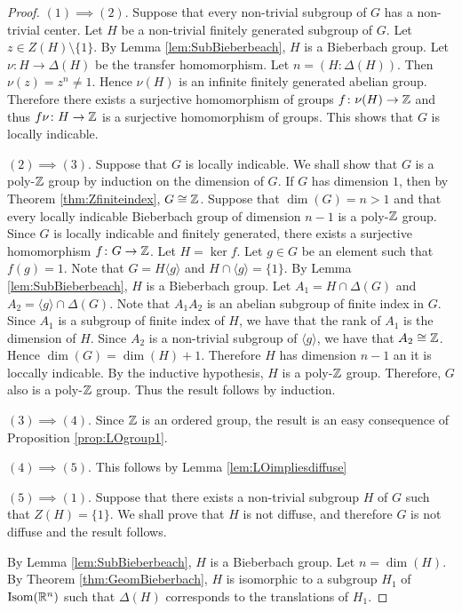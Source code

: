 \begin{proof}
$(1)\implies (2).$ Suppose that every non-trivial subgroup of $G$ has a non-trivial center. Let $H$ be a non-trivial finitely generated subgroup of $G$. Let $z\in Z(H)\setminus \{ 1\}$. By Lemma \ref{lem:SubBieberbeach}, $H$ is a Bieberbach group.  Let $\nu\colon H\to\Delta(H)$ be the transfer homomorphism. Let $n=(H:\Delta(H))$. Then $\nu(z)=z^n\neq 1$. Hence $\nu(H)$ is an infinite finitely generated abelian group. Therefore there exists a surjective homomorphism of groups $f\colon \nu(H)\to\mathbb{Z}$ and thus $f\nu \colon H\to\mathbb{Z}$ is a surjective homomorphism of groups. This shows that $G$ is locally indicable. 

$(2)\implies (3).$ Suppose that $G$ is locally indicable. We shall show that $G$ is a poly-$\mathbb{Z}$ group by induction on the dimension of $G$. If $G$ has dimension $1$, then by Theorem \ref{thm:Zfiniteindex}, $G\cong \mathbb{Z}$. Suppose that $\dim(G)=n>1$ and that every locally indicable Bieberbach group of dimension $n-1$ is a poly-$\mathbb{Z}$ group. Since $G$ is locally indicable and finitely generated, there exists a surjective homomorphism $f\colon G\to\mathbb{Z}$. Let $H=\ker f$. Let $g\in G$ be an element such that $f(g)=1$. Note that $G=H\langle g\rangle$ and $H\cap \langle g\rangle=\{ 1\}$. By Lemma \ref{lem:SubBieberbeach}, $H$ is a Bieberbach group. Let $A_1=H\cap\Delta (G)$ and $A_2=\langle g\rangle \cap\Delta(G)$. Note that $A_1A_2$ is an abelian subgroup of finite index in $G$. Since $A_1$ is a subgroup of finite index of $H$, we have that the rank of $A_1$ is the dimension of $H$. Since $A_2$ is a non-trivial subgroup of $\langle g\rangle$, we have that $A_2\cong \mathbb{Z}$.
Hence $\dim(G)=\dim (H)+1$. Therefore $H$ has dimension $n-1$ an it is loccally indicable. By the inductive hypothesis, $H$ is a poly-$\mathbb{Z}$ group. Therefore, $G$ also is a poly-$\mathbb{Z}$ group. Thus the result follows by induction. 

$(3)\implies (4).$ Since $\mathbb{Z}$ is an ordered group, the result is an easy consequence of Proposition \ref{prop:LOgroup1}.

$(4)\implies (5).$ This follows by Lemma \ref{lem:LOimpliesdiffuse}

$(5)\implies (1).$ Suppose that there exists a non-trivial subgroup $H$ of $G$ such that $Z(H)=\{ 1\}$. We shall prove that $H$ is not diffuse, and therefore $G$ is not diffuse and the result follows.

By Lemma \ref{lem:SubBieberbeach}, $H$ is a Bieberbach group. Let $n=\dim(H)$.
By Theorem \ref{thm:GeomBieberbach}, $H$ is isomorphic to a subgroup $H_1$ of $\operatorname{Isom}(\mathbb{R}^n)$ such that $\Delta(H)$ corresponds to the translations of $H_1$. 


\end{proof}
